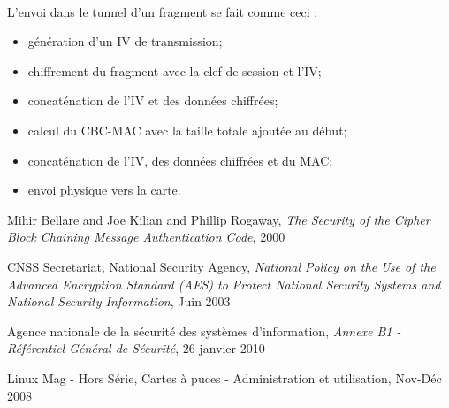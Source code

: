 \documentclass[a4paper,11pt,french]{article}
\begin{document}
\paragraph{}
L'envoi dans le tunnel d'un fragment se fait comme ceci : 
\begin{itemize}
    \item génération d'un IV de transmission;
    \item chiffrement du fragment avec la clef de session et l'IV;
    \item concaténation de l'IV et des données chiffrées;
    \item calcul du CBC-MAC avec la taille totale ajoutée au début;
    \item concaténation de l'IV, des données chiffrées et du MAC;
    \item envoi physique vers la carte.
\end{itemize} 
\begin{thebibliography}{9}


    Mihir Bellare and Joe Kilian and Phillip Rogaway,
  \emph{The Security of the Cipher Block Chaining Message Authentication Code},
    2000

CNSS Secretariat, National Security Agency,
\emph{National Policy on the Use of the Advanced Encryption Standard (AES) to 
Protect National Security Systems and National Security Information},
Juin 2003

Agence nationale de la sécurité des systèmes d’information,
\emph{Annexe B1 - Référentiel Général de Sécurité}, 26 janvier 2010


Linux Mag - Hors Série, 
Cartes à puces - Administration et utilisation, 
Nov-Déc 2008

\end{thebibliography}
\end{document}
